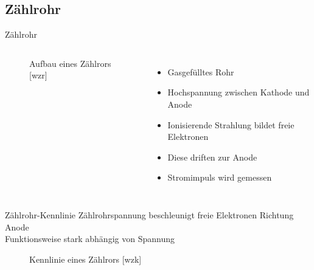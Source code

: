 \subsection[]{Zählrohr}

\begin{frame}{Zählrohr}
    \begin{columns}[T]
    
			\begin{figure}[htbp]
			  \centering
			  
			  \caption{Aufbau eines Zählrors [wzr]}
			\end{figure}
			
	    	\begin{itemize}
	    	  \item Gasgefülltes Rohr
			  \item Hochspannung zwischen Kathode und Anode
			  \item Ionisierende Strahlung bildet freie Elektronen
			  \item Diese driften zur Anode	
			  \item Stromimpuls wird gemessen
			\end{itemize}
    \end{columns}
\end{frame}


\begin{frame}{Zählrohr-Kennlinie}
	Zählrohrspannung beschleunigt freie Elektronen Richtung Anode \\
	Funktionsweise stark abhängig von Spannung
	
	\begin{figure}[htbp]
	  \centering
	  
	  \caption{Kennlinie eines Zählrors [wzk]}
	\end{figure}
	
\end{frame}	


